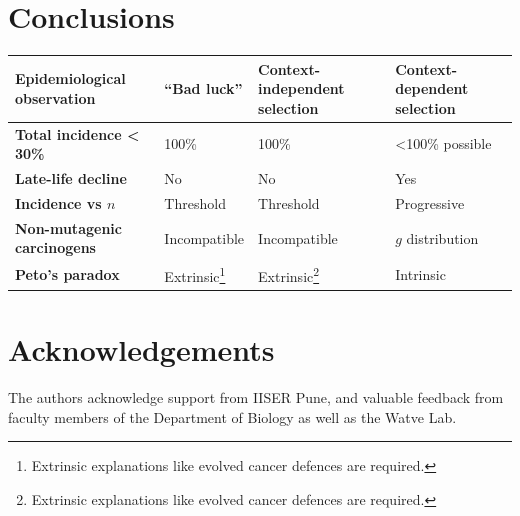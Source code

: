 \documentclass[a0,landscape]{a0poster}
\begin{document}
\begin{multicols}{3}
		\section{Conclusions}
		\begin{table}[H]
		\centering
			\begin{tabular}{p{.3\linewidth}|p{.2\linewidth}p{.25\linewidth}p{.225\linewidth}}
			\textbf{Epidemiological observation} & ``Bad luck'' & Context-independent selection & Context-dependent selection \\
			\hline
			\textbf{Total incidence < 30\%} & 100\% & 100\% & <100\% possible \\
			\textbf{Late-life decline} & No & No & Yes \\
			\textbf{Incidence vs $n$} & Threshold & Threshold & Progressive \\
			\textbf{Non-mutagenic carcinogens} & Incompatible & Incompatible & $g$ distribution \\
			\textbf{Peto's paradox} & Extrinsic\footnote[1]{Extrinsic explanations like evolved cancer defences are required.} & Extrinsic\footnote[1]{Extrinsic explanations like evolved cancer defences are required.} & Intrinsic \\
			\end{tabular}
		\end{table}

		\begin{minipage}{.5\linewidth}
		\renewcommand*{\bibfont}{\small}
		\printbibliography
		\end{minipage}
		\hspace{0.01\linewidth}
		\begin{minipage}{.5\linewidth}
		\small
		\section*{Acknowledgements}
		The authors acknowledge support from IISER Pune, and valuable feedback from faculty members of the Department of Biology as well as the Watve Lab.
		\end{minipage}
	
	
	
	

\end{multicols}
\end{document}
